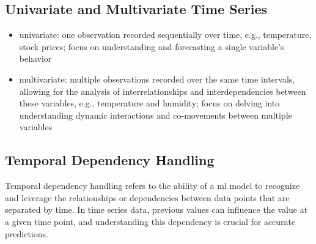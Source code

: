 \subsection{Univariate and Multivariate Time Series}
\begin{itemize}
    \item univariate: one observation recorded sequentially over time, e.g., temperature, stock prices; focus on understanding and forecasting a single variable's behavior
    \item multivariate: multiple observations recorded over the same time intervals, allowing for the analysis of interrelationships and interdependencies between these variables, e.g., temperature and humidity; focus on delving into understanding dynamic interactions and co-movements between multiple variables
\end{itemize}

\subsection{Temporal Dependency Handling}
Temporal dependency handling refers to the ability of a \acs{ml} model to recognize and leverage the relationships or dependencies between data points that are separated by time. 
In time series data, previous values can influence the value at a given time point, and understanding this dependency is crucial for accurate predictions.

